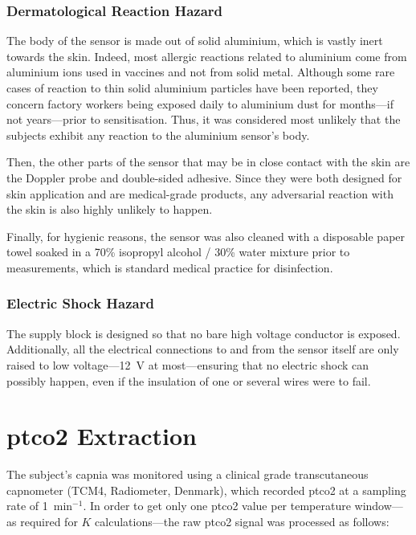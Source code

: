 \subsubsection{Dermatological Reaction Hazard}\label{annsect:dermato}

The body of the sensor is made out of solid aluminium, which is vastly inert towards the skin. Indeed, most allergic reactions related to aluminium come from aluminium ions used in vaccines and not from solid metal\cite{flint1998, hindsen2018}. Although some rare cases of reaction to thin solid aluminium particles have been reported, they concern factory workers being exposed daily to aluminium dust for months---if not years---prior to sensitisation\cite{hall1944, peters1998}. Thus, it was considered most unlikely that the subjects exhibit any reaction to the aluminium sensor's body.

Then, the other parts of the sensor that may be in close contact with the skin are the Doppler probe and double-sided adhesive. Since they were both designed for skin application and are medical-grade products, any adversarial reaction with the skin is also highly unlikely to happen.

Finally, for hygienic reasons, the sensor was also cleaned with a disposable paper towel soaked in a 70\% isopropyl alcohol / 30\% water mixture prior to measurements, which is standard medical practice for disinfection.

\subsubsection{Electric Shock Hazard}

The supply block is designed so that no bare high voltage conductor is exposed. Additionally, all the electrical connections to and from the sensor itself are only raised to low voltage---12~V at most---ensuring that no electric shock can possibly happen, even if the insulation of one or several wires were to fail.

\section{\texorpdfstring{\gls{ptco2}}{tcpCO2} Extraction}

The subject's capnia was monitored using a clinical grade transcutaneous capnometer (TCM4, Radiometer, Denmark), which recorded \gls{ptco2} at a sampling rate of 1~min$^{-1}$. In order to get only one \gls{ptco2} value per temperature window---as required for $K$ calculations---the raw \gls{ptco2} signal was processed as follows:

